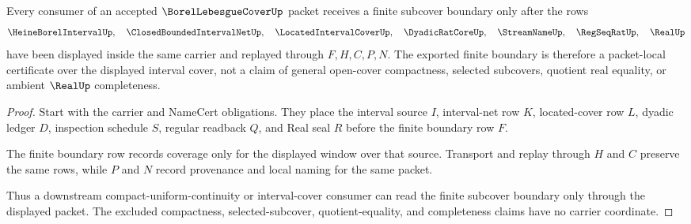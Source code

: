 \begin{theorem}
\label{thm:borel-lebesgue-cover-finite-subcover-boundary}
Every consumer of an accepted $\BorelLebesgueCoverUp$ packet receives a finite
subcover boundary only after the rows
$$
\HeineBorelIntervalUp,\quad
\ClosedBoundedIntervalNetUp,\quad
\LocatedIntervalCoverUp,\quad
\DyadicRatCoreUp,\quad
\StreamNameUp,\quad
\RegSeqRatUp,\quad
\RealUp
$$
have been displayed inside the same carrier and replayed through $F,H,C,P,N$.
The exported finite boundary is therefore a packet-local certificate over the
displayed interval cover, not a claim of general open-cover compactness,
selected subcovers, quotient real equality, or ambient $\RealUp$ completeness.
\end{theorem}
\begin{proof}
Start with the carrier and NameCert obligations. They place the interval
source $I$, interval-net row $K$, located-cover row $L$, dyadic ledger $D$,
inspection schedule $S$, regular readback $Q$, and Real seal $R$ before the
finite boundary row $F$.

The finite boundary row records coverage only for the displayed window over
that source. Transport and replay through $H$ and $C$ preserve the same rows,
while $P$ and $N$ record provenance and local naming for the same packet.

Thus a downstream compact-uniform-continuity or interval-cover consumer can
read the finite subcover boundary only through the displayed packet. The
excluded compactness, selected-subcover, quotient-equality, and completeness
claims have no carrier coordinate.
\end{proof}




